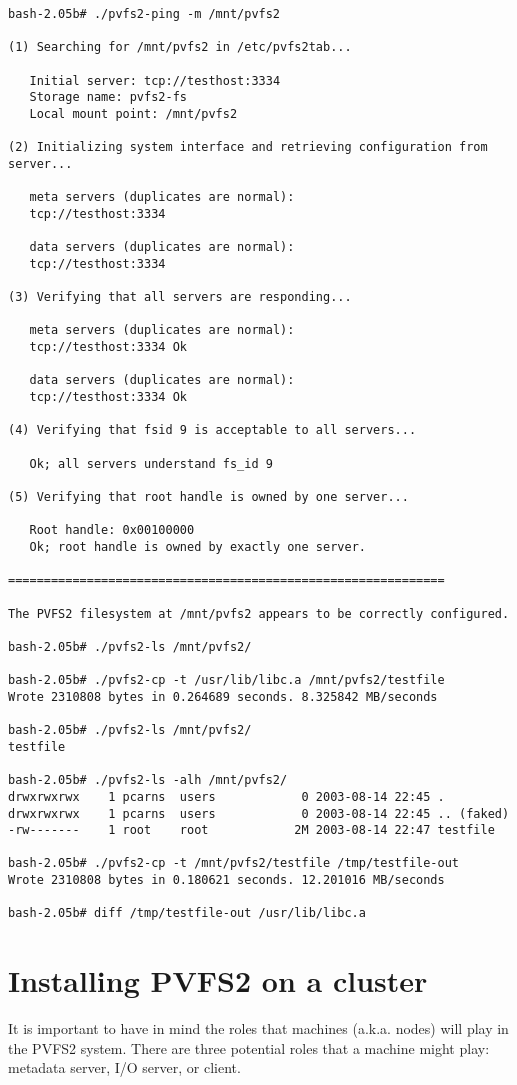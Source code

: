 \documentclass[11pt, letterpaper]{article}
\begin{document}
\begin{verbatim}
bash-2.05b# ./pvfs2-ping -m /mnt/pvfs2

(1) Searching for /mnt/pvfs2 in /etc/pvfs2tab...

   Initial server: tcp://testhost:3334
   Storage name: pvfs2-fs
   Local mount point: /mnt/pvfs2

(2) Initializing system interface and retrieving configuration from server...

   meta servers (duplicates are normal):
   tcp://testhost:3334

   data servers (duplicates are normal):
   tcp://testhost:3334

(3) Verifying that all servers are responding...

   meta servers (duplicates are normal):
   tcp://testhost:3334 Ok

   data servers (duplicates are normal):
   tcp://testhost:3334 Ok

(4) Verifying that fsid 9 is acceptable to all servers...

   Ok; all servers understand fs_id 9

(5) Verifying that root handle is owned by one server...

   Root handle: 0x00100000
   Ok; root handle is owned by exactly one server.

=============================================================

The PVFS2 filesystem at /mnt/pvfs2 appears to be correctly configured.

bash-2.05b# ./pvfs2-ls /mnt/pvfs2/

bash-2.05b# ./pvfs2-cp -t /usr/lib/libc.a /mnt/pvfs2/testfile
Wrote 2310808 bytes in 0.264689 seconds. 8.325842 MB/seconds

bash-2.05b# ./pvfs2-ls /mnt/pvfs2/
testfile

bash-2.05b# ./pvfs2-ls -alh /mnt/pvfs2/
drwxrwxrwx    1 pcarns  users            0 2003-08-14 22:45 .
drwxrwxrwx    1 pcarns  users            0 2003-08-14 22:45 .. (faked)
-rw-------    1 root    root            2M 2003-08-14 22:47 testfile

bash-2.05b# ./pvfs2-cp -t /mnt/pvfs2/testfile /tmp/testfile-out
Wrote 2310808 bytes in 0.180621 seconds. 12.201016 MB/seconds

bash-2.05b# diff /tmp/testfile-out /usr/lib/libc.a
\end{verbatim}

\section{Installing PVFS2 on a cluster}
\label{sec:cluster}
It is important to have in mind the roles that machines (a.k.a. nodes) will
play in the PVFS2 system. There are three potential roles that a machine might
play: metadata server,  I/O server, or client. 
\end{document}
